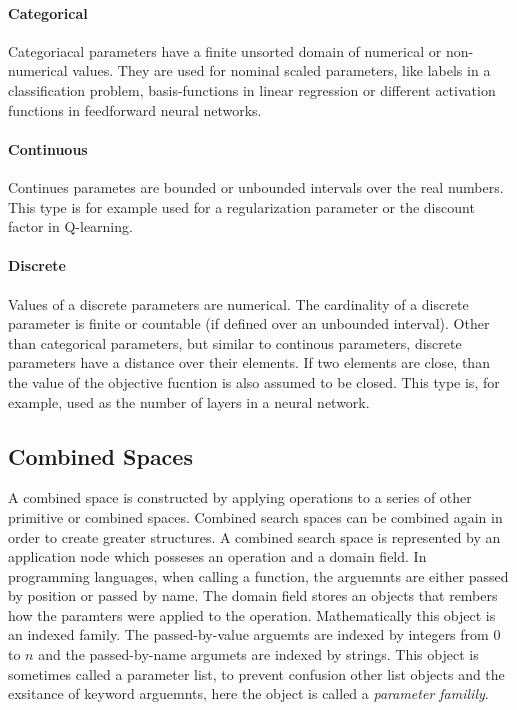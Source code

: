 \documentclass[english]{article}
\begin{document}
\paragraph{Categorical}
Categoriacal parameters have a finite unsorted domain of numerical or non-numerical values. They are used for nominal scaled parameters, like labels in a classification problem, basis-functions in linear regression or different activation functions in feedforward neural networks.

\paragraph{Continuous}
Continues parametes are bounded or unbounded intervals over the real numbers. This type is for example used for a regularization parameter or the discount factor in Q-learning.

\paragraph{Discrete}
Values of a discrete parameters are numerical. The cardinality of a discrete parameter is finite or countable (if defined over an unbounded interval).
Other than categorical parameters, but similar to continous parameters, discrete parameters have a distance over their elements. If two elements are close, than the value of the objective fucntion is also assumed to be closed. This type is, for example, used as the number of layers in a neural network.

\subsection{Combined Spaces}
A combined space is constructed by applying operations to a series of other primitive or combined spaces. Combined search spaces can be combined again in order to create greater structures. A combined search space is represented by an application node which posseses an operation and a domain field. In programming languages, when calling a function, the arguemnts are either passed by position or passed by name. The domain field stores an objects that rembers how the paramters were applied to the operation. Mathematically this object is an indexed family. The passed-by-value arguemts are indexed by integers from $0$ to $n$ and the passed-by-name argumets are indexed by strings. This object is sometimes called a parameter list, to prevent confusion other list objects and the exsitance of keyword arguemnts, here the object is called a \textit{parameter familily}.
\end{document}
